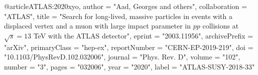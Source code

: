 @article{ATLAS:2020xyo,
    author = "Aad, Georges and others",
    collaboration = "ATLAS",
    title = "{Search for long-lived, massive particles in events with a displaced vertex and a muon with large impact parameter in $pp$ collisions at $\sqrt{s} = 13$ TeV with the ATLAS detector}",
    eprint = "2003.11956",
    archivePrefix = "arXiv",
    primaryClass = "hep-ex",
    reportNumber = "CERN-EP-2019-219",
    doi = "10.1103/PhysRevD.102.032006",
    journal = "Phys. Rev. D",
    volume = "102",
    number = "3",
    pages = "032006",
    year = "2020",
    label = "ATLAS-SUSY-2018-33"
}
